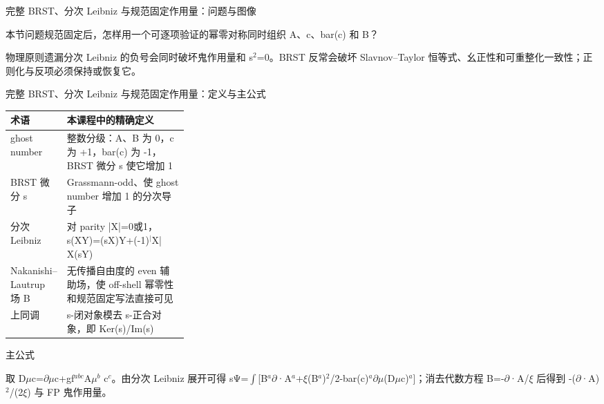 \begin{frame}[t]{完整 BRST、分次 Leibniz 与规范固定作用量：问题与图像}
\footnotesize
\begin{block}{本节问题}规范固定后，怎样用一个可逐项验证的幂零对称同时组织 A、c、bar(c) 和 B？\end{block}
\begin{block}{物理原则}\quad 遗漏分次 Leibniz 的负号会同时破坏鬼作用量和 s\ensuremath{^{2}}=0。BRST 反常会破坏 Slavnov--Taylor 恒等式、幺正性和可重整化一致性；正则化与反项必须保持或恢复它。\end{block}
\end{frame}

\begin{frame}[t]{完整 BRST、分次 Leibniz 与规范固定作用量：定义与主公式}
\footnotesize\begin{tabularx}{\linewidth}{p{0.30\linewidth}Y}
\toprule 术语 & 本课程中的精确定义\\\midrule
{} ghost number & 整数分级：A、B 为 0，c 为 +1，bar(c) 为 -1，BRST 微分 s 使它增加 1\\
 BRST 微分 s & Grassmann-odd、使 ghost number 增加 1 的分次导子\\
 分次 Leibniz & 对 parity |X|=0或1，s(XY)=(sX)Y+(-1)\ensuremath{^{|}}X| X(sY)\\
 Nakanishi--Lautrup 场 B & 无传播自由度的 even 辅助场，使 off-shell 幂零性和规范固定写法直接可见\\
 上同调 & s-闭对象模去 s-正合对象，即 Ker(s)/\allowbreak{}Im(s)\\
\bottomrule\end{tabularx}\vspace{0.15cm}
\begin{block}{ 主公式}\centering{}\end{block}
取 D\ensuremath{\mu}c=\ensuremath{\partial}\ensuremath{\mu}c+gf\ensuremath{^{abc}}A\ensuremath{\mu}\ensuremath{^{b}} c\ensuremath{^{c}}。由分次 Leibniz 展开可得 sΨ=\ensuremath{\int}[B\ensuremath{^{a}}\ensuremath{\partial}·A\ensuremath{^{a}}+\ensuremath{\xi}(B\ensuremath{^{a}})\ensuremath{^{2}}/\allowbreak{}2-bar(c)\ensuremath{^{a}}\ensuremath{\partial}\ensuremath{\mu}(D\ensuremath{\mu}c)\ensuremath{^{a}}]；消去代数方程 B=-\ensuremath{\partial}·A/\allowbreak{}\ensuremath{\xi} 后得到 -(\ensuremath{\partial}·A)\ensuremath{^{2}}/\allowbreak{}(2\ensuremath{\xi}) 与 FP 鬼作用量。
\end{frame}

